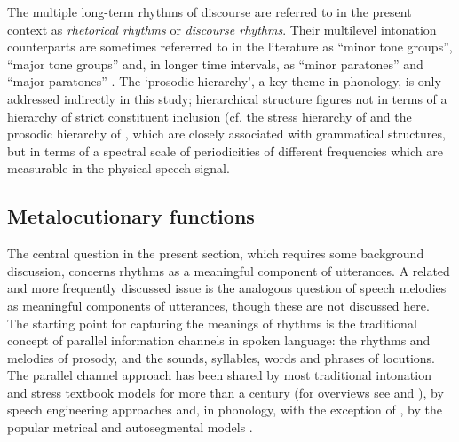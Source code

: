 \documentclass[output=paper,colorlinks,citecolor=brown]{langscibook}
\begin{document}
The multiple long-term rhythms of discourse are referred to in the present context as \textit{rhetorical rhythms} or \textit{discourse rhythms}. Their multilevel intonation counterparts are sometimes refererred to in the literature as ``minor tone groups'', ``major tone groups'' \citep{trim1959} and, in longer time intervals, as ``minor paratones'' and ``major paratones'' \citep{yuleparatone1980}. The `prosodic hierarchy', a key theme in phonology, is only addressed indirectly in this study; hierarchical structure figures not in terms of a hierarchy of strict constituent inclusion (cf. the stress hierarchy of \citet{chomskyhalle1968} and the prosodic hierarchy of \citet{selkirk1984}, which are closely associated with grammatical structures, but in terms of a spectral scale of periodicities of different frequencies which are measurable in the physical speech signal.

\subsection{Metalocutionary functions}

The central question in the present section, which requires some background discussion, concerns rhythms as a meaningful component of utterances. A related and more frequently discussed issue is the analogous question of speech melodies as meaningful components of utterances, though these are not discussed here. The starting point for capturing the meanings of rhythms is the traditional concept of parallel information channels in spoken language: the rhythms and melodies of prosody, and the sounds, syllables, words and phrases of locutions. The parallel channel approach has been shared by most traditional intonation and stress textbook models for more than a century (for overviews see \citet{gibbon1976} and \citet{arvaniti2022}), by speech engineering approaches \citep{morikawafujisaki1976, thartcohen73, dutoit2001, fujisaki2004} and, in phonology, with the exception of , by the popular metrical and autosegmental models \citep{barnesshattuckhufnagel2022}.
\end{document}
